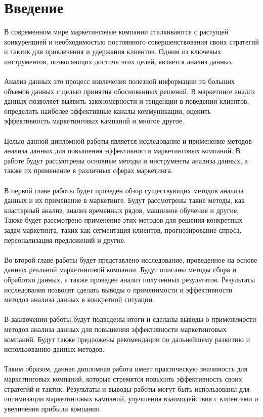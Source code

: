 \documentclass{article}
\begin{document}
\section{Введение}
В современном мире маркетинговые компании сталкиваются с растущей конкуренцией и необходимостью постоянного совершенствования своих стратегий и тактик для привлечения и удержания клиентов. Одним из ключевых инструментов, позволяющих достичь этих целей, является анализ данных.\\
~\\
Анализ данных  это процесс извлечения полезной информации из больших объемов данных с целью принятия обоснованных решений. В маркетинге анализ данных позволяет выявить закономерности и тенденции в поведении клиентов, определить наиболее эффективные каналы коммуникации, оценить эффективность маркетинговых кампаний и многое другое.\\
~\\
Целью данной дипломной работы является исследование и применение методов анализа данных для повышения эффективности маркетинговых компаний. В работе будут рассмотрены основные методы и инструменты анализа данных, а также их применение в различных сферах маркетинга.\\
~\\
В первой главе работы будет проведен обзор существующих методов анализа данных и их применение в маркетинге. Будут рассмотрены такие методы, как кластерный анализ, анализ временных рядов, машинное обучение и другие. Также будет рассмотрено применение этих методов для решения конкретных задач маркетинга, таких как сегментация клиентов, прогнозирование спроса, персонализация предложений и другие.\\
~\\
Во второй главе работы будет представлено исследование, проведенное на основе данных реальной маркетинговой компании. Будут описаны методы сбора и обработки данных, а также проведен анализ полученных результатов. Результаты исследования позволят сделать выводы о применимости и эффективности методов анализа данных в конкретной ситуации.\\
~\\
В заключении работы будут подведены итоги и сделаны выводы о применимости методов анализа данных для повышения эффективности маркетинговых компаний. Будут также предложены рекомендации по дальнейшему развитию и использованию данных методов.\\
~\\
Таким образом, данная дипломная работа имеет практическую значимость для маркетинговых компаний, которые стремятся повысить эффективность своих стратегий и тактик. Результаты и выводы работы могут быть использованы для оптимизации маркетинговых кампаний, улучшения взаимодействия с клиентами и увеличения прибыли компании.
\end{document}
